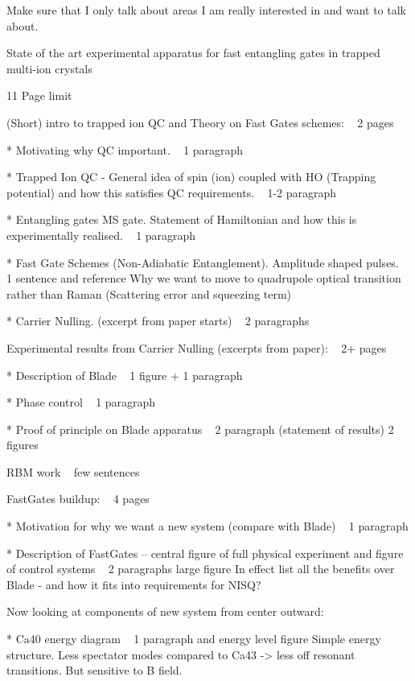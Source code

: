 \documentclass{article}
\begin{document}
Make sure that I only talk about areas I am really interested in and want to talk about. 


State of the art experimental apparatus for fast entangling gates in trapped multi-ion crystals

11 Page limit

(Short) intro to trapped ion QC and Theory on Fast Gates schemes: ~ 2 pages

    * Motivating why QC important. ~ 1 paragraph

    * Trapped Ion QC - General idea of spin (ion) coupled with HO (Trapping potential) and how this satisfies QC requirements. ~ 1-2 paragraph

    * Entangling gates MS gate. Statement of Hamiltonian and how this is experimentally realised. ~ 1 paragraph

    * Fast Gate Schemes (Non-Adiabatic Entanglement). Amplitude shaped pulses. ~ 1 sentence and reference
        Why we want to move to quadrupole optical transition rather than Raman (Scattering error and squeezing term)

    * Carrier Nulling. (excerpt from paper starts) ~ 2 paragraphs

 

Experimental results from Carrier Nulling (excerpts from paper): ~ 2+ pages

    * Description of Blade ~ 1 figure + 1 paragraph

    * Phase control ~ 1 paragraph

    * Proof of principle on Blade apparatus ~ 2 paragraph (statement of results) 2 figures

    RBM work ~ few sentences

 

FastGates buildup: ~ 4 pages

    * Motivation for why we want a new system (compare with Blade) ~ 1 paragraph

    * Description of FastGates – central figure of full physical experiment and figure of control systems ~ 2 paragraphs large figure
        In effect list all the benefits over Blade - and how it fits into requirements for NISQ?

    Now looking at components of new system from center outward:

    * Ca40 energy diagram  ~ 1 paragraph and energy level figure
        Simple energy structure. Less spectator modes compared to Ca43 -> less off resonant transitions. But sensitive to B field.
\end{document}
